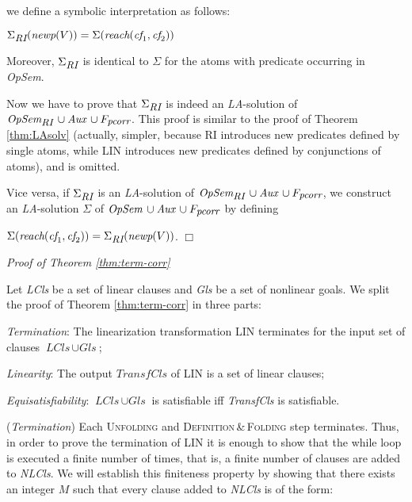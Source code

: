 \documentclass[english]{tlp}
\newcommand{\eop}{\hfill$\Box$}
\begin{document}
\smallskip

\noindent
we define a symbolic interpretation as follows:

\smallskip

$\Sigma_{\textit{\small{RI}}}(\textit{newp}(V)) = \Sigma(\textit{reach}(\textit{cf}_1,\textit{cf}_2))$

\smallskip

\noindent
Moreover, $\Sigma_{\textit{\small{RI}}}$ is identical to $\Sigma$ for the atoms with
predicate occurring in \textit{OpSem}.

Now we have to prove that $\Sigma_{\textit{\small{RI}}}$ is indeed an
{\it LA}-solution of $\textit{OpSem}_{\textit{\small{RI}}}\, \cup 
\textit{Aux}\, \cup F_{\textit{\small{pcorr}}}$. This proof is similar to
the proof of Theorem \ref{thm:LAsolv} (actually, simpler, because RI
introduces new predicates defined by single atoms, while LIN introduces
new predicates defined by conjunctions of atoms), and is omitted.

Vice versa, if $\Sigma_{\textit{\small{RI}}}$ is an {\it LA}-solution
of $\textit{OpSem}_{\textit{\small{RI}}}\, \cup \textit{Aux}\, \cup F_{\textit{\small{pcorr}}}$,
we construct an {\it LA}-solution $\Sigma$ of 
 $\textit{OpSem}\, \cup \textit{Aux}\, \cup F_{\textit{\small{pcorr}}}$
by defining

$\Sigma(\textit{reach}(\textit{cf}_1,\textit{cf}_2)) = \Sigma_{\textit{\small{RI}}}(\textit{newp}(V))$.
\hfill \eop





\bigskip

\noindent
{\it Proof of Theorem \ref{thm:term-corr}} 

\noindent
Let {\it LCls} be a set of linear clauses and \textit{Gls} be a set of nonlinear goals. 
We split the proof of Theorem \ref{thm:term-corr} in three parts:

\noindent
{\it Termination}: The \textrm{linearization} transformation LIN terminates for the input set of clauses $\textit{LCls}\, \cup \textit{Gls}$;

\noindent
{\it Linearity}: The output $\textit{TransfCls}$ of LIN is a set of linear clauses;

\noindent
{\it Equisatisfiability}: $\textit{LCls}\, \cup \textit{Gls}$ is satisfiable iff
	\textit{TransfCls} is satisfiable.

\smallskip

\noindent
({\it Termination}) 
Each \textsc{Unfolding} and \textsc{Definition}\,\&\,\textsc{Folding} step terminates.
Thus, in order to prove the termination of LIN it is enough to show
that the while loop is executed a finite number of times, that is,
a finite number of clauses are added to {\it NLCls}.
We will establish this finiteness property by showing that there exists
an integer $M$ such that every clause added to {\it NLCls} is of the form:
\end{document}
